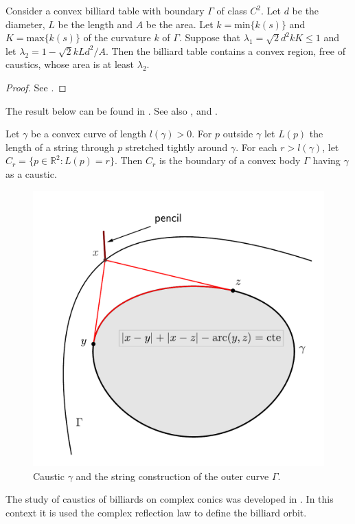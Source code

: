   \begin{theorem} Consider a convex billiard table with boundary $\Gamma$ of class $C^2$. Let $d$ be the diameter, $L$ be the length and $A$ be the area. Let 
   $k=\text{min}\{k(s)\}$ and $K=\text{max}\{k(s)\}$ of the curvature $k$ of $\Gamma$.  Suppose that $\lambda_1=\sqrt{2}d^2kK\leq 1$ and let $\lambda_2=1-\sqrt{2}kLd^2/A$. Then the billiard table contains a convex region, free of caustics, whose area is at least $\lambda_2$.\end{theorem}
   \begin{proof} See \cite{katok3-1995}.
   \end{proof}
   
     The result below can be found in   \cite[Lecture 10]{sinai-1977}. See also \cite{bialy-maxim-2018}, \cite[Lecture 28]{fuchs-2007} and \cite{gruber-1990}.
     
   \begin{proposition}\label{prop:caustic} Let $\gamma$ be a convex curve of length $l(\gamma)>0$.
   For $p$  outside $\gamma$ let $ L(p)$   the length of a string through $p$ stretched tightly around $\gamma$. For each $r>l(\gamma)$, let $C_r=\{p\in\mathbb{R}^2: L(p)=r\}.$ Then  $C_r$ is the  boundary of a convex body $\Gamma$ having $\gamma$ as a caustic.
      \end{proposition}
       \begin{figure}[H]
	\begin{center}
 \includegraphics[scale=0.4]{zappC/pics/pics_appC_150_string_construcao.pdf}
		\caption {  Caustic $\gamma$ and the string construction of the outer  curve $\Gamma$. \label{fig:appC-caustica}}
	\end{center}
\end{figure}

  
   
   
    
   
   \begin{remark}
       The study of caustics of billiards on complex conics was developed in \cite{corentin2021-circum}. In this context it is used the   complex reflection law to define the billiard orbit.
   \end{remark}
      
 
 
